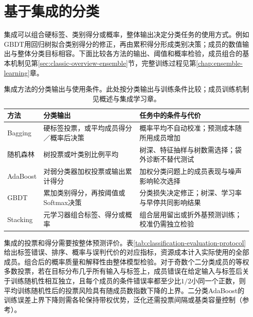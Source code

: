 \section{基于集成的分类}
\label{sec:classification-ensemble}

集成可以组合硬标签、类别得分或概率，整体输出决定分类任务的使用方式。例如GBDT用回归树拟合类别得分的修正，再由累积得分形成类别决策；成员的数值输出与整体分类目标相容。下面比较各方法的输出、阈值和概率检验，成员组合的基本机制见第\ref{sec:classic-overview-ensemble}节，完整训练过程见第\ref{chap:ensemble-learning}章。

\begin{table}[htbp]
  \centering
  \small
  \begin{tabularx}{\linewidth}{@{}>{\RaggedRight\arraybackslash}p{22mm}>{\RaggedRight\arraybackslash}X>{\RaggedRight\arraybackslash}X@{}}
    \toprule
    方法 & 分类输出 & 任务中的条件与代价 \\
    \midrule
    Bagging & 硬标签投票，或平均成员得分／概率后决策 & 概率平均不自动校准；预测成本随所用成员增加 \\
    随机森林 & 树投票或叶类别比例平均 & 树深、特征抽样与树数需选择；袋外诊断不替代测试 \\
    AdaBoost & 对弱分类器加权投票或输出累计得分 & 加权分类问题上的成员表现与噪声影响轮次选择 \\
    GBDT & 累加类别得分，再按阈值或Softmax决策 & 分类损失决定修正；树深、学习率与早停共同影响结果 \\
    Stacking & 元学习器组合标签、得分或概率 & 组合层用留出或折外基预测训练；校准仍需独立检验 \\
    \bottomrule
  \end{tabularx}
  \caption{集成方法的分类输出与使用条件。此处按分类输出与训练条件比较；成员训练机制见概述与集成学习章。}
  \label{tab:classification-ensemble-map}
\end{table}

集成的投票和得分需要按整体预测评价。表\ref{tab:classification-evaluation-protocol}给出标签错误、排序、概率与误判代价的对应指标，资源成本计入实际使用的全部成员。组合后的概率质量和解释性由整体模型检验。对于奇数个二分类成员的等权多数投票，若在目标分布几乎所有输入与标签上，成员错误在给定输入与标签后关于训练随机性相互独立，且每个成员的条件错误率都至少比$1/2$小同一个正数，则平均训练随机性后的投票风险具有随成员数指数下降的上界。二分类AdaBoost的训练误差上界下降则需各轮保持带权优势，泛化还需投票间隔或基类容量控制（参考）。
